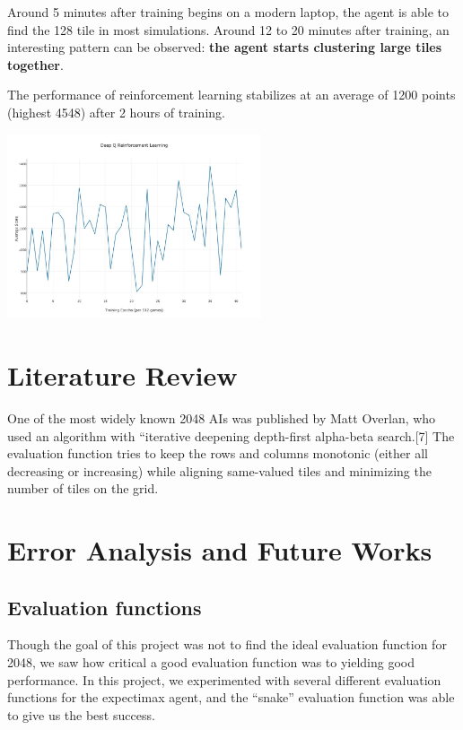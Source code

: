 \documentclass[9pt,twocolumn]{article}
\begin{document}
Around 5 minutes after training begins on a modern laptop, the agent is able to find the 128 tile in most simulations. Around 12 to 20 minutes after training, an interesting pattern can be observed: \textbf{the agent starts clustering large tiles together}.

The performance of reinforcement learning stabilizes at an average of 1200 points (highest 4548) after 2 hours of training.

\begin{centering}

\includegraphics[width=75mm]{rl_graph.jpg}

\end{centering}

\section{Literature Review}

One of the most widely known 2048 AIs was published by Matt Overlan, who used an algorithm with “iterative deepening depth-first alpha-beta search.[7] The evaluation function tries to keep the rows and columns monotonic (either all decreasing or increasing) while aligning same-valued tiles and minimizing the number of tiles on the grid.

\section{Error Analysis and Future Works}

\subsection{Evaluation functions}

Though the goal of this project was not to find the ideal evaluation function for 2048, we saw how critical a good evaluation function was to yielding good performance. In this project, we experimented with several different evaluation functions for the expectimax agent, and the “snake” evaluation function was able to give us the best success.
\end{document}
